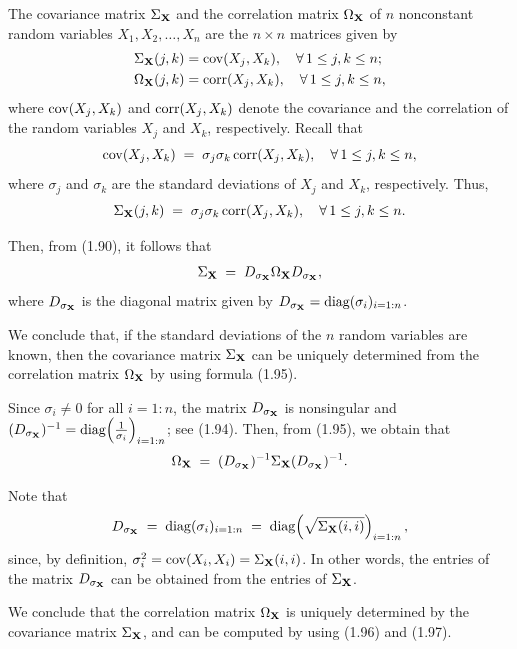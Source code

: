 The covariance matrix $\Sigma_{\mathbf{X}}$ and the correlation matrix
$\Omega_{\mathbf{X}}$ of $n$ nonconstant random variables $X_1,X_2,\ldots,X_n$
are the $n\times n$ matrices given by
\begin{align*}
\Sigma_{\mathbf{X}}(j,k) &= \operatorname{cov}(X_j,X_k), \quad \forall\, 1\le j,k\le n; \\
\Omega_{\mathbf{X}}(j,k) &= \operatorname{corr}(X_j,X_k), \quad \forall\, 1\le j,k\le n,
\end{align*}
where $\operatorname{cov}(X_j,X_k)$ and $\operatorname{corr}(X_j,X_k)$ denote the covariance and the
correlation of the random variables $X_j$ and $X_k$, respectively. Recall
that
\[
\operatorname{cov}(X_j,X_k) \;=\; \sigma_j\sigma_k\operatorname{corr}(X_j,X_k), \quad \forall\, 1\le j,k\le n,
\]
where $\sigma_j$ and $\sigma_k$ are the standard deviations of $X_j$ and
$X_k$, respectively. Thus,
\[
\Sigma_{\mathbf{X}}(j,k) \;=\; \sigma_j\sigma_k\operatorname{corr}(X_j,X_k), \quad \forall\, 1\le j,k\le n.
\]

Then, from (1.90), it follows that
\begin{equation}
\Sigma_{\mathbf{X}} \;=\; D_{\sigma_{\mathbf{X}}}\Omega_{\mathbf{X}}D_{\sigma_{\mathbf{X}}},
\end{equation}
where $D_{\sigma_{\mathbf{X}}}$ is the diagonal matrix given by
$D_{\sigma_{\mathbf{X}}}=\operatorname{diag}(\sigma_i)_{i=1:n}$.

We conclude that, if the standard deviations of the $n$ random variables
are known, then the covariance matrix $\Sigma_{\mathbf{X}}$ can be uniquely
determined from the correlation matrix $\Omega_{\mathbf{X}}$ by using formula
(1.95).

Since $\sigma_i\ne 0$ for all $i=1:n$, the matrix $D_{\sigma_{\mathbf{X}}}$ is
nonsingular and
$(D_{\sigma_{\mathbf{X}}})^{-1}=\operatorname{diag}\!\left(\frac{1}{\sigma_i}\right)_{i=1:n}$;
see (1.94). Then, from (1.95), we obtain that
\begin{equation}
\Omega_{\mathbf{X}} \;=\; (D_{\sigma_{\mathbf{X}}})^{-1}\Sigma_{\mathbf{X}}(D_{\sigma_{\mathbf{X}}})^{-1}.
\end{equation}

Note that
\begin{equation}
D_{\sigma_{\mathbf{X}}} \;=\; \operatorname{diag}(\sigma_i)_{i=1:n} \;=\; \operatorname{diag}\!\left(\sqrt{\Sigma_{\mathbf{X}}(i,i)}\right)_{i=1:n},
\end{equation}
since, by definition, $\sigma_i^2=\operatorname{cov}(X_i,X_i)=\Sigma_{\mathbf{X}}(i,i)$. In
other words, the entries of the matrix $D_{\sigma_{\mathbf{X}}}$ can be
obtained from the entries of $\Sigma_{\mathbf{X}}$.

We conclude that the correlation matrix $\Omega_{\mathbf{X}}$ is uniquely
determined by the covariance matrix $\Sigma_{\mathbf{X}}$, and can be computed
by using (1.96) and (1.97).

